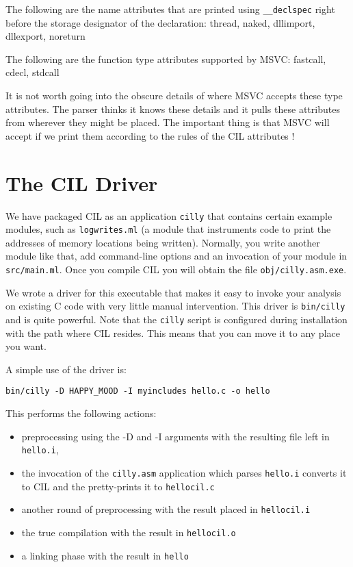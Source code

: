 \documentclass{article}
\def\t#1{{\tt #1}}
\begin{document}
   The following are the name attributes that are printed using
   \t{\_\_declspec} right before the storage designator of the declaration:
   thread, naked, dllimport, dllexport, noreturn


   The following are the function type attributes supported by MSVC: 
   fastcall, cdecl, stdcall

   It is not worth going into the obscure details of where MSVC accepts these
   type attributes. The parser thinks it knows these details and it pulls
   these attributes from wherever they might be placed. The important thing
   is that MSVC will accept if we print them according to the rules of the CIL
   attributes ! 

\section{The CIL Driver}\label{sec-driver}

 We have packaged CIL as an application \t{cilly} that contains certain
example modules, such as \t{logwrites.ml} (a module
that instruments code to print the addresses of memory locations being
written). Normally, you write another module like that, add command-line
options and an invocation of your module in \t{src/main.ml}. Once you compile
CIL you will obtain the file \t{obj/cilly.asm.exe}. 

 We wrote a driver for this executable that makes it easy to invoke your
analysis on existing C code with very little manual intervention. This driver
is \t{bin/cilly} and is quite powerful. Note that the \t{cilly} script
is configured during installation with the path where CIL resides. This means
that you can move it to any place you want. 

 A simple use of the driver is:
\begin{verbatim}
bin/cilly -D HAPPY_MOOD -I myincludes hello.c -o hello
\end{verbatim}

 This performs the following actions: 
\begin{itemize}
\item preprocessing using the -D and -I arguments with the resulting file left in \t{hello.i}, 
\item the invocation of the \t{cilly.asm} application which parses \t{hello.i}
converts it to CIL and the pretty-prints it to \t{hellocil.c}
\item another round of preprocessing with the result placed in \t{hellocil.i}
\item the true compilation with the result in \t{hellocil.o}
\item a linking phase with the result in \t{hello}
\end{itemize}
 
\end{document}
